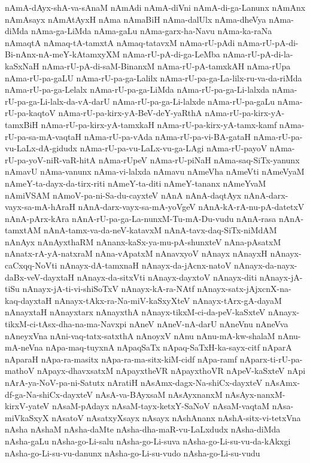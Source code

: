 {nAmA-dAyx-shA-va-sAnaM
nAmAdi
nAmA-diVni
nAmA-di-ga-Lanunx
nAmAnx
nAmAsayx
nAmAtAyxH
nAma
nAmaBiH
nAma-dalUlx
nAma-dheVya
nAma-diMda
nAma-ga-LiMda
nAma-gaLu
nAma-garx-ha-Navu
nAma-ka-raNa
nAmaqtA
nAmaq-tA-tamxtA
nAmaq-tatavxM
nAma-rU-pAdi
nAma-rU-pA-di-Bi-nAnx-nA-meY-kAtamxyXM
nAma-rU-pA-di-ga-LeMba
nAma-rU-pA-di-la-kaSxNaH
nAma-rU-pA-di-saM-BinanxM
nAma-rU-pA-tamxkAH
nAma-rUpa
nAma-rU-pa-gaLU
nAma-rU-pa-ga-Lalilx
nAma-rU-pa-ga-La-lilx-ru-va-da-riMda
nAma-rU-pa-ga-Lelalx
nAma-rU-pa-ga-LiMda
nAma-rU-pa-ga-Li-lalxda
nAma-rU-pa-ga-Li-lalx-da-vA-darU
nAma-rU-pa-ga-Li-lalxde
nAma-rU-pa-gaLu
nAma-rU-pa-kaqtoV
nAma-rU-pa-kirx-yA-BeV-deY-yaRthA
nAma-rU-pa-kirx-yA-tamxBiH
nAma-rU-pa-kirx-yA-tamxkaH
nAma-rU-pa-kirx-yA-tamx-kamf
nAma-rU-pa-sa-mA-vaqtaH
nAma-rU-pa-vAda
nAma-rU-pa-vi-BA-gataH
nAma-rU-pa-vu-LaLx-dA-gidudx
nAma-rU-pa-vu-LaLx-vu-ga-LAgi
nAma-rU-payoV
nAma-rU-pa-yoV-niR-vaR-hitA
nAma-rUpeV
nAma-rU-piNaH
nAma-saq-SiTx-yanunx
nAmavU
nAma-vanunx
nAma-vi-lalxda
nAmavu
nAmeVha
nAmeVti
nAmeVyaM
nAmeY-ta-dayx-da-tirx-riti
nAmeY-ta-diti
nAmeY-tananx
nAmeYvaM
nAmiVSAM
nAmoV-pa-ni-Sa-du-cayxteV
nAnA
nAnA-daqtAyx
nAnA-darx-vayx-sa-mA-hAraH
nAnA-darx-vayx-sa-mA-yoVgeV
nAnA-kA-rA-nu-pA-datetxV
nAnA-pArx-kAra
nAnA-rU-pa-ga-La-nunxM-Tu-mA-Du-vudu
nAnA-rasa
nAnA-tamxtAM
nAnA-tamx-va-da-neV-katavxM
nAnA-tavx-daq-SiTx-niMdAM
nAnAyx
nAnAyxthaRM
nAnanx-kaSx-ya-mu-pA-shunxteV
nAna-pAsatxM
nAnatx-rA-yA-natxraM
nAna-vApatxM
nAnavxyoV
nAnayx
nAnayxH
nAnayx-caCxqq-NoVti
nAnayx-dA-tamxnaH
nAnayx-da-jAcnx-natoV
nAnayx-da-nayx-daBx-veV-dayxtaH
nAnayx-da-sitxVti
nAnayx-dayxtoV
nAnayx-diti
nAnayx-jA-tiSu
nAnayx-jA-ti-vi-shiSoTxV
nAnayx-kA-ra-NAtf
nAnayx-satx-jAjxcnX-na-kaq-dayxtaH
nAnayx-tAkx-ra-Na-miV-kaSxyXteV
nAnayx-tArx-gA-dayaM
nAnayxtaH
nAnayxtarx
nAnayxthA
nAnayx-tikxM-ci-da-peV-kaSxteV
nAnayx-tikxM-ci-tAsx-dha-na-ma-Navxpi
nAneV
nAneV-nA-darU
nAneVnu
nAneVva
nAneyxVna
nAni-vaq-tatx-satxthA
nAnoyxV
nAnu
nAnu-mA-kw-shalaM
nAnu-mA-neVna
nApa-maq-tuyxnA
nApaqSaTx
nApaq-SaTxH-ka-sayx-citf
nAparA
nAparaH
nApa-ra-masitx
nApa-ra-ma-sitx-kiM-cidf
nApa-ramf
nAparx-ti-rU-pa-mathoV
nApayx-dhavxsatxM
nApayxtheVR
nApayxthoVR
nApeV-kaSxteV
nApi
nArA-ya-NoV-pa-ni-Satutx
nAratiH
nAsAmx-dagx-Na-shiCx-dayxteV
nAsAmx-df-ga-Na-shiCx-dayxteV
nAsA-va-BAyxsaM
nAsAyxnanxM
nAsAyx-nanxM-kirxV-yateV
nAsaM-pAdayx
nAsaM-tayx-ketxY-SaNoV
nAsaM-vaqtaM
nAsa-miVkaSxyX
nAsatoV
nAsatxyXsayx
nAsayx
nAshAnanx
nAshA-sitx-vi-tetxVna
nAsha
nAshaM
nAsha-daMte
nAsha-dha-maR-vu-LaLxdudx
nAsha-diMda
nAsha-gaLu
nAsha-go-Li-salu
nAsha-go-Li-suva
nAsha-go-Li-su-vu-da-kAkxgi
nAsha-go-Li-su-vu-danunx
nAsha-go-Li-su-vudo
nAsha-go-Li-su-vudu
}
